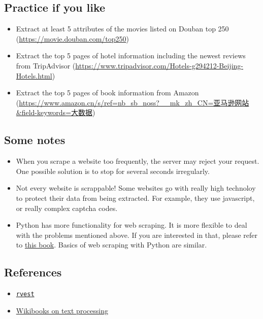 \subsection{Practice if you like}\label{practice-if-you-like}

\begin{itemize}
\item
  Extract at least 5 attributes of the movies listed on Douban top 250
  (\url{https://movie.douban.com/top250})
\item
  Extract the top 5 pages of hotel information including the newest
  reviews from TripAdvisor
  (\url{https://www.tripadvisor.com/Hotels-g294212-Beijing-Hotels.html})
\item
  Extract the top 5 pages of book information from Amazon
  (\href{https://www.amazon.cn/s/ref=nb_sb_noss?__mk_zh_CN=\%E4\%BA\%9A\%E9\%A9\%AC\%E9\%80\%8A\%E7\%BD\%91\%E7\%AB\%99\&field-keywords=\%E5\%A4\%A7\%E6\%95\%B0\%E6\%8D\%AE}{https://www.amazon.cn/s/ref=nb\_sb\_noss?\_\_mk\_zh\_CN=亚马逊网站\&field-keywords=大数据})
\end{itemize}

\subsection{Some notes}\label{some-notes}

\begin{itemize}
\item
  When you scrape a website too frequently, the server may reject your
  request. One possible solution is to stop for several seconds
  irregularly.
\item
  Not every website is scrappable! Some websites go with really high
  technoloy to protect their data from being extracted. For example,
  they use javascript, or really complex captcha codes.
\item
  Python has more functionality for web scraping. It is more flexible to
  deal with the problems mentioned above. If you are interested in that,
  please refer to
  \href{https://yanfei.site/docs/dpsa/references/PyWebScrapingBook.pdf}{this
  book}. Basics of web scraping with Python are similar.
\end{itemize}

\subsection{References}\label{references}

\begin{itemize}
\tightlist
\item
  \href{https://cran.r-project.org/web/packages/rvest/rvest.pdf}{\texttt{rvest}}
\item
  \href{https://en.wikibooks.org/wiki/R_Programming/Text_Processing}{Wikibooks
  on text processing}
\end{itemize}

